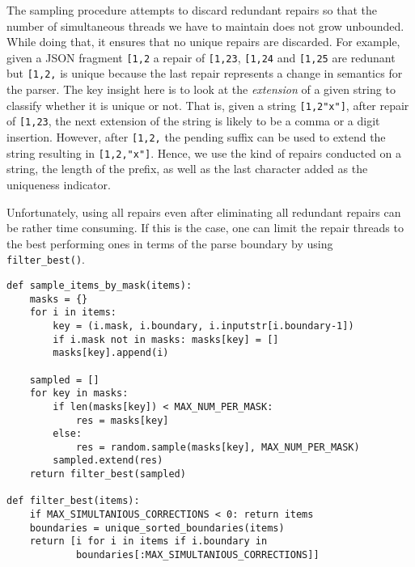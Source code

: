 \documentclass[sigconf,review,anonymous]{acmart}
\def\<#1>{\texttt{#1}}
\newcounter{todocounter}
\newcommand{\todo}[1]{\marginpar{$|$}\textcolor{red}{\stepcounter{todocounter}\footnote[\thetodocounter]{\textcolor{red}{\textbf{TODO }}\textit{#1}}}}
\newcommand{\recheck}[1]{\textcolor{red}{#1}}
\renewcommand{\todo}[1]{}
\newcommand{\approach}{\textsc{FSynth}\xspace}
\begin{document}
The sampling procedure attempts to discard redundant repairs so that the number
of simultaneous threads we have to maintain does not grow unbounded. While doing
that, it ensures that no unique repairs are discarded. For
example, given a JSON fragment \<[1,2> a repair of \<[1,23>, \<[1,24>
and \<[1,25> are redunant but \<[1,2,> is unique because the last repair
represents a change in semantics for the parser. The key insight here is to
look at the \emph{extension} of a given string to classify whether it is unique
or not. That is, given a string \<[1,2"x"]>, after repair of \<[1,23>, the next
extension of the string is likely to be a comma or a digit insertion. However,
after \<[1,2,> the pending suffix can be used to extend the string resulting in
\<[1,2,"x"]>.
    Hence, we use the kind of repairs conducted on a string, the
length of the prefix, as well as the last character added as the
uniqueness indicator.

Unfortunately, using all repairs even after eliminating all redundant repairs
can be rather time consuming. If this is the case, one can limit the repair
threads to the best performing ones in terms of the parse boundary by using
\<filter\_best()>.

\begin{lstlisting}[caption=Sampling,label={lst:sampling}]
def sample_items_by_mask(items):
    masks = {}
    for i in items:
        key = (i.mask, i.boundary, i.inputstr[i.boundary-1])
        if i.mask not in masks: masks[key] = []
        masks[key].append(i)

    sampled = []
    for key in masks:
        if len(masks[key]) < MAX_NUM_PER_MASK:
            res = masks[key]
        else:
            res = random.sample(masks[key], MAX_NUM_PER_MASK)
        sampled.extend(res)
    return filter_best(sampled)

def filter_best(items):
    if MAX_SIMULTANIOUS_CORRECTIONS < 0: return items
    boundaries = unique_sorted_boundaries(items)
    return [i for i in items if i.boundary in
            boundaries[:MAX_SIMULTANIOUS_CORRECTIONS]]
\end{lstlisting}
\end{document}

